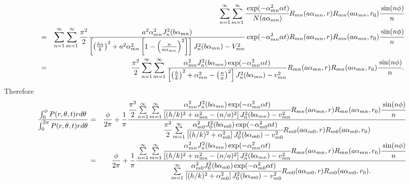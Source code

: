 \documentclass{article}
\begin{document}
\begin{eqnarray}
    & & \sum\limits_{n=1}^{\infty}\sum\limits_{m=1}^{\infty}
        \cfrac{\exp(-\alpha_{mn}^2\alpha t)}{N(a\alpha_{mn})}
        R_{mn}(a\alpha_{mn}, r) R_{mn}(a\alpha_{mn}, r_0) \cfrac{\sin(n\phi)}{n}
\nonumber\\
    &=& \sum\limits_{n=1}^{\infty}\sum\limits_{m=1}^{\infty} \frac{\pi^2}{2}
        \frac{a^2\alpha_{mn}^2 J_n^2(b\alpha_{mn})}
        {\left[
            \left(\frac{ha}{k}\right)^2 +
            a^2\alpha_{mn}^2\left[1 - \left(\frac{n}{a\alpha_{mn}}\right)^2\right]
            \right]J_n^2(b\alpha_{mn}) - V_{mn}^2}
        \exp(-\alpha_{mn}^2\alpha t)
        R_{mn}(a\alpha_{mn}, r) R_{mn}(a\alpha_{mn}, r_0) \cfrac{\sin(n\phi)}{n}
\nonumber\\
    &=& \frac{\pi^2}{2} \sum\limits_{n=1}^{\infty}\sum\limits_{m=1}^{\infty}
        \frac{\alpha_{mn}^2 J_n^2(b\alpha_{mn})\exp(-\alpha_{mn}^2\alpha t)}
        {\left[
            \left(\frac{h}{k}\right)^2 +
            \alpha_{mn}^2 - \left(\frac{n}{a}\right)^2
        \right]J_n^2(b\alpha_{mn}) - v_{mn}^2}
        R_{mn}(a\alpha_{mn}, r) R_{mn}(a\alpha_{mn}, r_0) \cfrac{\sin(n\phi)}{n}.
\end{eqnarray}
%
Therefore
%
\begin{eqnarray}
    \frac{\int_0^{\phi} P(r, \theta, t) rd\theta}
         {\int_0^{2\pi} P(r, \theta, t) rd\theta}
    &=& \frac{\phi}{2\pi} + \frac{1}{\pi}
    \cfrac{
        \cfrac{\pi^2}{2} \sum\limits_{n=1}^{\infty}\sum\limits_{m=1}^{\infty}
        \cfrac{\alpha_{mn}^2 J_n^2(b\alpha_{mn})\exp(-\alpha_{mn}^2\alpha t)}
        {\left[(h/k)^2 + \alpha_{mn}^2 - (n/a)^2\right]J_n^2(b\alpha_{mn}) - v_{mn}^2}
        R_{mn}(a\alpha_{mn}, r) R_{mn}(a\alpha_{mn}, r_0) \cfrac{\sin(n\phi)}{n}
    }{
        \cfrac{\pi^2}{2} \sum\limits_{m=1}^{\infty}
        \cfrac{\alpha_{m0}^2 J_0^2(b\alpha_{m0})\exp(-\alpha_{m0}^2\alpha t)}
        {\left[(h/k)^2 + \alpha_{m0}^2\right]J_0^2(b\alpha_{m0}) - v_{m0}^2}
        R_{m0}(a\alpha_{m0}, r) R_{m0}(a\alpha_{m0}, r_0)
    }
\nonumber\\
    &=& \frac{\phi}{2\pi} + \frac{1}{\pi}
    \cfrac{
        \sum\limits_{n=1}^{\infty}\sum\limits_{m=1}^{\infty}
        \cfrac{\alpha_{mn}^2 J_n^2(b\alpha_{mn})\exp(-\alpha_{mn}^2\alpha t)}
        {\left[(h/k)^2 + \alpha_{mn}^2 - (n/a)^2\right]J_n^2(b\alpha_{mn}) - v_{mn}^2}
        R_{mn}(a\alpha_{mn}, r) R_{mn}(a\alpha_{mn}, r_0) \cfrac{\sin(n\phi)}{n}
    }{
        \sum\limits_{m=1}^{\infty}
        \cfrac{\alpha_{m0}^2 J_0^2(b\alpha_{m0})\exp(-\alpha_{m0}^2\alpha t)}
        {\left[(h/k)^2 + \alpha_{m0}^2\right]J_0^2(b\alpha_{m0}) - v_{m0}^2}
        R_{m0}(a\alpha_{m0}, r) R_{m0}(a\alpha_{m0}, r_0).
    }
\nonumber
\end{eqnarray}
\end{document}

